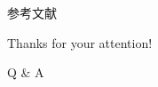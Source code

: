 \documentclass[9pt]{ctexbeamer}
\begin{document}
\appendix

\begin{frame}[allowframebreaks]{参考文献}
	
	
\end{frame}

\begin{frame}
	\begin{center}
		{\Huge\calligra Thanks for your attention!}
		\vspace{1cm}

		{\Huge Q \& A}
	\end{center}
\end{frame}
\end{document}
